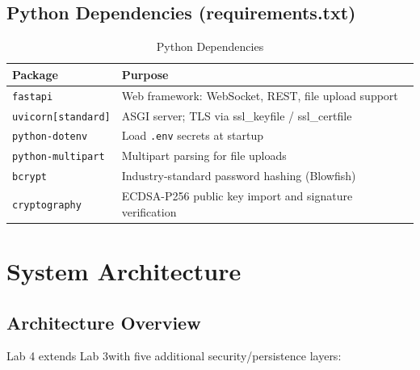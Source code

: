 \documentclass[12pt, a4paper]{article}
\begin{document}
\subsection{Python Dependencies (requirements.txt)}

\begin{table}[H]
    \centering
    \caption{Python Dependencies}
    \begin{tabularx}{\textwidth}{l X}
        \toprule
        \textbf{Package} & \textbf{Purpose} \\
        \midrule
        \texttt{fastapi}           & Web framework: WebSocket, REST, file upload support \\
        \texttt{uvicorn[standard]} & ASGI server; TLS via ssl\_keyfile / ssl\_certfile \\
        \texttt{python-dotenv}     & Load \texttt{.env} secrets at startup \\
        \texttt{python-multipart}  & Multipart parsing for file uploads \\
        \texttt{bcrypt}            & Industry-standard password hashing (Blowfish) \\
        \texttt{cryptography}      & ECDSA-P256 public key import and signature verification \\
        \bottomrule
    \end{tabularx}
\end{table}


\section{System Architecture}

\subsection{Architecture Overview}



Lab 4 extends Lab 3with five additional security/persistence layers:
\end{document}

